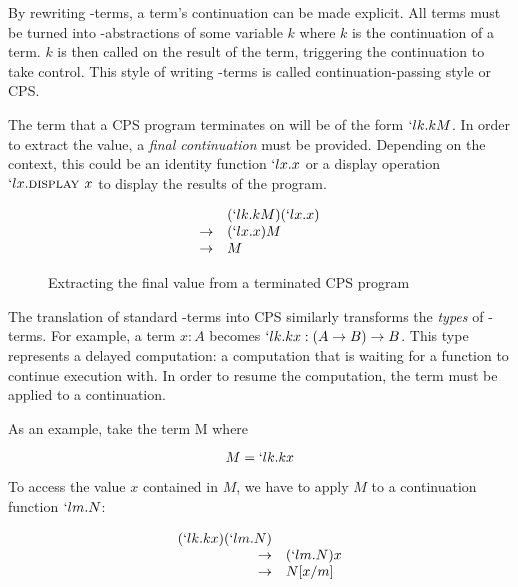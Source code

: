   By rewriting \lam-terms, a term's continuation can be made explicit. All
  terms must be turned into \lam-abstractions of some variable $k$
  where $k$ is the continuation of a term. $k$ is then called on the
  result of the term, triggering the continuation to take control.
  This style of writing \lam-terms is called continuation-passing
  style or CPS.
  
  
  The term that a CPS program terminates on will be of the form
  $`lk.kM$. In order to extract the value, a \emph{final continuation}
  must be provided. Depending on the context, this could be an identity 
  function $`lx.x$ or a display operation $`lx.\textsc{display }x$ to
  display the results of the program.

  \begin{figure}[!h]
  \caption{Extracting the final value from a terminated CPS program}
  \[
  \begin{array}{ll}
                & (`lk.kM)(`lx.x) \\
    \rightarrow & (`lx.x)M \\
    \rightarrow & M
  \end{array}
  \]
  \end{figure}
 
  The translation of standard \lam-terms into CPS similarly transforms the 
  \emph{types} of \lam-terms. For example, a term $x : A$ becomes 
  $`lk.kx : (A \to B) \to B$. This type represents a delayed computation:
  a computation that is waiting for a function to continue execution with. 
  In order to resume the computation, the term must be applied to a 
  continuation.
  
  As an example, take the term M where
  
  \[
    M = `lk.kx
  \]

  To access the value $x$ contained in $M$, we have to apply $M$ to a
  continuation function $`lm.N$:
  
  \[
  \begin{array}{rl}
      (`lk.kx)(`lm.N) \\
      \to & (`lm.N)x \\
      \to & N[x/m]
  \end{array}
  \]
  

